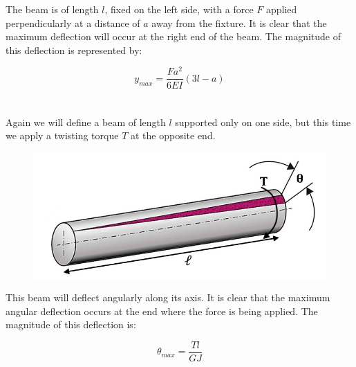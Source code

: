 \documentclass[a4paper]{article}
\begin{document}
	The beam is of length $ l $, fixed on the left side, with a force $ F $ applied perpendicularly at a distance of $ a $ away from the fixture. It is clear that the maximum deflection will occur at the right end of the beam. The magnitude of this deflection is represented by:
	
	\begin{equation}
		y_{max} = \frac{F a^2}{6 EI} \left( 3l - a \right)
	\end{equation}\\\\
	
	
	Again we will define a beam of length $ l $ supported only on one side, but this time we apply a twisting torque $ T $ at the opposite end.
	
	\begin{figure}[H]
		\centering
		\includegraphics[width=0.7\linewidth]{../img/beambend_twist}
	\end{figure}

	This beam will deflect angularly along its axis. It is clear that the maximum angular deflection occurs at the end where the force is being applied. The magnitude of this deflection is:
	
	\begin{equation}
		\theta_{max} = \frac{T l}{GJ}
	\end{equation}\\
	
	
	
	
\end{document}

